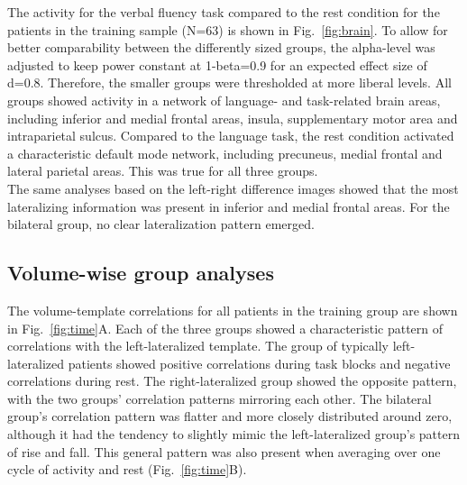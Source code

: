 \documentclass[fleqn,10pt]{SelfArx} %
\begin{document}
The activity for the verbal fluency task compared to the rest condition for the patients in the training sample (N=63) is shown in Fig.~\ref{fig:brain}. To allow for better comparability between the differently sized groups, the alpha-level was adjusted to keep power constant at 1-beta=0.9 for an expected effect size of d=0.8. Therefore, the smaller groups were thresholded at more liberal levels. All groups showed activity in a network of language- and task-related brain areas, including inferior and medial frontal areas, insula, supplementary motor area and intraparietal sulcus. Compared to the language task, the rest condition activated a characteristic default mode network, including precuneus, medial frontal and lateral parietal areas. This was true for all three groups.\\
The same analyses based on the left-right difference images showed that the most lateralizing information was present in inferior and medial frontal areas. For the bilateral group, no clear lateralization pattern emerged.

\subsection{Volume-wise group analyses} \label{Volume-wise group analyses}

The volume-template correlations for all patients in the training group are shown in Fig.~\ref{fig:time}A. Each of the three groups showed a characteristic pattern of correlations with the left-lateralized template. The group of typically left-lateralized patients showed positive correlations during task blocks and negative correlations during rest. The right-lateralized group showed the opposite pattern, with the two groups’ correlation patterns mirroring each other. The bilateral group’s correlation pattern was flatter and more closely distributed around zero, although it had the tendency to slightly mimic the left-lateralized group’s pattern of rise and fall. This general pattern was also present when averaging over one cycle of activity and rest (Fig.~\ref{fig:time}B).
	
\end{document}
